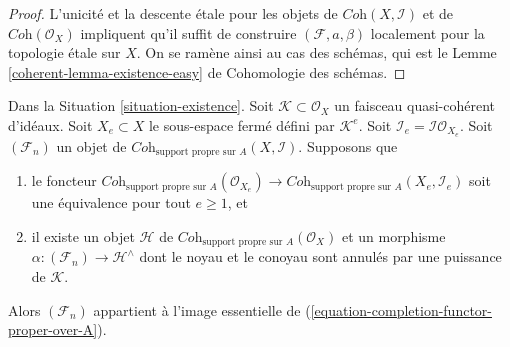 \begin{proof}
L'unicité et la descente étale pour les objets de
$\textit{Coh}(X, \mathcal{I})$ et de $\textit{Coh}(\mathcal{O}_X)$
impliquent qu'il suffit de construire $(\mathcal{F}, a, \beta)$ localement
pour la topologie étale sur $X$. On se ramène ainsi au cas des schémas, qui est le
Lemme \ref{coherent-lemma-existence-easy} de Cohomologie des schémas.
\end{proof}

\begin{lemma}
\label{lemma-existence-tricky}
Dans la Situation \ref{situation-existence}. Soit $\mathcal{K} \subset \mathcal{O}_X$
un faisceau quasi-cohérent d'idéaux. Soit $X_e \subset X$ le sous-espace fermé
défini par $\mathcal{K}^e$. Soit $\mathcal{I}_e = \mathcal{I}\mathcal{O}_{X_e}$.
Soit $(\mathcal{F}_n)$ un objet de
$\textit{Coh}_{\text{support propre sur } A}(X, \mathcal{I})$.
Supposons que
\begin{enumerate}
\item le foncteur
$\textit{Coh}_{\text{support propre sur } A}(\mathcal{O}_{X_e})
\to \textit{Coh}_{\text{support propre sur } A}(X_e, \mathcal{I}_e)$
soit une équivalence pour tout $e \geq 1$, et
\item il existe un objet $\mathcal{H}$ de
$\textit{Coh}_{\text{support propre sur } A}(\mathcal{O}_X)$ et un morphisme
$\alpha : (\mathcal{F}_n) \to \mathcal{H}^\wedge$ dont le
noyau et le conoyau sont annulés par une puissance de $\mathcal{K}$.
\end{enumerate}
Alors $(\mathcal{F}_n)$ appartient à l'image essentielle de
(\ref{equation-completion-functor-proper-over-A}).
\end{lemma}

